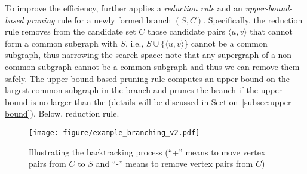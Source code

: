 To improve the efficiency,   further applies a \emph{reduction rule} and an \emph{upper-bound-based pruning} rule for a newly formed branch $(S,C)$. Specifically, the reduction rule {\cheng removes} from the candidate set $C$ those candidate pairs $\langle u,v\rangle$ that cannot form a common subgraph with $S$, i.e., $S\cup \{\langle u,v \rangle$\} cannot be a common subgraph, thus narrowing the search space: note that any supergraph of a non-common subgraph cannot be a common subgraph and thus we can remove them safely. The upper-bound-based pruning rule {\cheng computes} an upper bound on the  largest common subgraph in the branch and {\cheng prunes} the branch if the upper bound is no larger than the  {\YuiR (details will be discussed in Section~\ref{subsec:upper-bound})}. 
{\chengB Below,   reduction rule.}
%
\begin{figure}[]
		\texttt{[image: figure/example\_branching\_v2.pdf]}
  \vspace{-0.15in}
	\caption{Illustrating the backtracking process (``+'' means to {\chengB move} vertex pairs from $C$ to $S$ and ``-'' means to remove vertex pairs from $C$)}
 \vspace{-0.2in}
	\label{fig:example_branching}
\end{figure}



